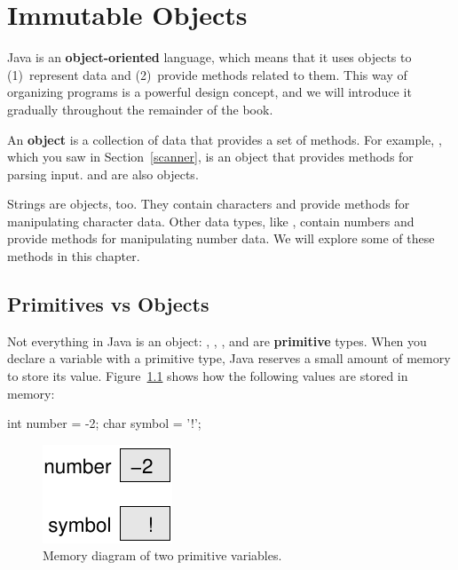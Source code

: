\chapter{Immutable Objects}
\label{immutable}


Java is an {\bf object-oriented} language, which means that it uses objects to (1)~represent data and (2)~provide methods related to them.
This way of organizing programs is a powerful design concept, and we will introduce it gradually throughout the remainder of the book.


An {\bf object} is a collection of data that provides a set of methods.
For example, , which you saw in Section~\ref{scanner}, is an object that provides methods for parsing input.
 and  are also objects.

Strings are objects, too.
They contain characters and provide methods for manipulating character data.
Other data types, like , contain numbers and provide methods for manipulating number data.
We will explore some of these methods in this chapter.


\section{Primitives vs Objects}


Not everything in Java is an object: , , , and  are {\bf primitive} types.
When you declare a variable with a primitive type, Java reserves a small amount of memory to store its value.
Figure~\ref{fig.mem1} shows how the following values are stored in memory:

\begin{code}
int number = -2;
char symbol = '!';
\end{code}

\begin{figure}[!ht]
\begin{center}
\includegraphics{figs/mem1.pdf}
\caption{Memory diagram of two primitive variables.}
\label{fig.mem1}
\end{center}
\end{figure}

